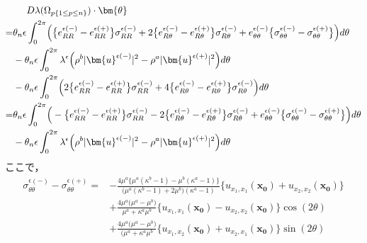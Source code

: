 \begin{align}
	&\hspace{0.5cm}D\lambda(\Omega_{p\{1\leq p\leq n\}})\cdot\bm{\theta}
	\nonumber
	\\
	=&\theta_{n}\epsilon\int_{0}^{2\pi}
		\Bigr(\bigl\{e_{RR}^{\epsilon(-)}-e_{RR}^{\epsilon(+)}\bigr\}\sigma_{RR}^{\epsilon(-)}
		+2\bigl\{e_{R\theta}^{\epsilon(-)}-e_{R\theta}^{\epsilon(+)}\bigr\}\sigma_{R\theta}^{\epsilon(-)}
		+e_{\theta\theta}^{\epsilon(-)}\bigl\{\sigma_{\theta\theta}^{\epsilon(-)}-\sigma_{\theta\theta}^{\epsilon(+)}\bigr\}
		\Bigl) d\theta
		\nonumber
		\\
	&-\theta_{n}\epsilon\int_{0}^{2\pi}
		\lambda^{\epsilon}\Bigr(
		\rho^{b}|\bm{u}^{\epsilon(-)}|^{2}-\rho^{a}|\bm{u}^{\epsilon(+)}|^{2}
		\Bigl) d\theta
		\nonumber
		\\
	&-\theta_{n}\epsilon\int_{0}^{2\pi}\Bigr(
		2\bigl\{e_{RR}^{\epsilon(-)}-e_{RR}^{\epsilon(+)}\bigr\}\sigma_{RR}^{\epsilon(-)}
		+4\bigl\{e_{R\theta}^{\epsilon(-)}-e_{R\theta}^{\epsilon(+)}\bigr\}\sigma_{R\theta}^{\epsilon(-)}
		\Bigl) d\theta
	\nonumber
	\\
	=&\theta_{n}\epsilon\int_{0}^{2\pi}
		\Bigr(-\bigl\{e_{RR}^{\epsilon(-)}-e_{RR}^{\epsilon(+)}\bigr\}\sigma_{RR}^{\epsilon(-)}
		-2\bigl\{e_{R\theta}^{\epsilon(-)}-e_{R\theta}^{\epsilon(+)}\bigr\}\sigma_{R\theta}^{\epsilon(-)}
		+e_{\theta\theta}^{\epsilon(-)}\bigl\{\sigma_{\theta\theta}^{\epsilon(-)}-\sigma_{\theta\theta}^{\epsilon(+)}\bigr\}
		\Bigl) d\theta
		\nonumber
		\\
	&-\theta_{n}\epsilon\int_{0}^{2\pi}
		\lambda^{\epsilon}\Bigr(
		\rho^{b}|\bm{u}^{\epsilon(-)}|^{2}-\rho^{a}|\bm{u}^{\epsilon(+)}|^{2}
		\Bigl) d\theta
	\label{eq:SDForTDRTh}
\end{align}
ここで，
\begin{align}
	\sigma_{\theta\theta}^{\epsilon(-)}-\sigma_{\theta\theta}^{\epsilon(+)}
	=&-\frac{4\mu^{a}\bigl\{\mu^{a}(\kappa^{b}-1)-\mu^{b}(\kappa^{a}-1)\bigr\}}
	{\bigl(\mu^{a}(\kappa^{b}-1)+2\mu^{b}\bigr)(\kappa^{a}-1)}
	\bigl\{u_{x_{1},x_{1}}(\bm{x_{0}})+u_{x_{2},x_{2}}(\bm{x_{0}})\bigr\}
	\nonumber
	\\
	&+\frac{4\mu^{a}\bigl(\mu^{a}-\mu^{b}\bigr)}
	{\mu^{a}+\kappa^{a}\mu^{b}}
	\bigl\{u_{x_{1},x_{1}}(\bm{x_{0}})-u_{x_{2},x_{2}}(\bm{x_{0}})\bigr\}\cos(2\theta)
	\nonumber
	\\
	&+\frac{4\mu^{a}\bigl(\mu^{a}-\mu^{b}\bigr)}
	{(\mu^{a}+\kappa^{a}\mu^{b}}
	\bigl\{u_{x_{1},x_{2}}(\bm{x_{0}})+u_{x_{2},x_{1}}(\bm{x_{0}})\bigr\}\sin(2\theta)
	\label{eq:eThThOutEpsSol}
\end{align}

